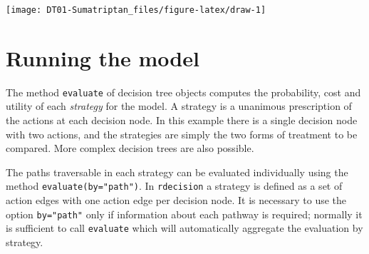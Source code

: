 \documentclass[
]{article}
\newenvironment{Shaded}{\begin{snugshade}}{\end{snugshade}}
\newcommand{\AttributeTok}[1]{\textcolor[rgb]{0.77,0.63,0.00}{#1}}
\newcommand{\CommentTok}[1]{\textcolor[rgb]{0.56,0.35,0.01}{\textit{#1}}}
\newcommand{\FunctionTok}[1]{\textcolor[rgb]{0.00,0.00,0.00}{#1}}
\newcommand{\NormalTok}[1]{#1}
\newcommand{\OtherTok}[1]{\textcolor[rgb]{0.56,0.35,0.01}{#1}}
\newcommand{\SpecialCharTok}[1]{\textcolor[rgb]{0.00,0.00,0.00}{#1}}
\newcommand{\StringTok}[1]{\textcolor[rgb]{0.31,0.60,0.02}{#1}}
\begin{document}
\begin{Shaded}
\end{Shaded}

\begin{center}\texttt{[image: DT01-Sumatriptan\_files/figure-latex/draw-1]} \end{center}

\hypertarget{running-the-model}{%
\section{Running the model}\label{running-the-model}}

The method \texttt{evaluate} of decision tree objects computes the
probability, cost and utility of each \emph{strategy} for the model. A
strategy is a unanimous prescription of the actions at each decision
node. In this example there is a single decision node with two actions,
and the strategies are simply the two forms of treatment to be compared.
More complex decision trees are also possible.

The paths traversable in each strategy can be evaluated individually
using the method \texttt{evaluate(by="path")}. In \texttt{rdecision} a
strategy is defined as a set of action edges with one action edge per
decision node. It is necessary to use the option \texttt{by="path"} only
if information about each pathway is required; normally it is sufficient
to call \texttt{evaluate} which will automatically aggregate the
evaluation by strategy.
\end{document}
